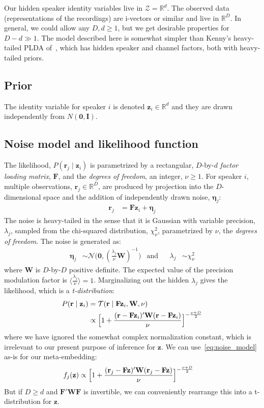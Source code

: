 \documentclass[a4paper,oneside,12pt,english]{report}
\def\zvec{\mathbf{z}}
\def\ND{\mathcal{N}}
\def\expp#1{\bigl\langle#1\bigr\rangle}
\def\R{\mathbb{R}}
\def\Zset{\mathcal{Z}}
\def\Wmat{\mathbf{W}}
\def\Fmat{\mathbf{F}}
\def\Imat{\mathbf{I}}
\def\rvec{\mathbf{r}}
\def\Zset{\mathcal{Z}}
\def\nulvec{\boldsymbol{0}}
\begin{document}
Our hidden speaker identity variables live in $\Zset=\R^d$. The observed data (representations of the recordings) are i-vectors or similar and live in $\R^D$. In general, we could allow any $D,d\ge1$, but we get desirable properties for $D-d\gg 1$. The model described here is somewhat simpler than Kenny's heavy-tailed PLDA of~\cite{ht-plda}, which has hidden speaker and channel factors, both with heavy-tailed priors. 

\subsection{Prior}
The identity variable for speaker $i$ is denoted $\zvec_i\in\R^d$ and they are drawn independently from $N(\nulvec,\Imat)$. 

\subsection{Noise model and likelihood function}
\def\etavec{\boldsymbol{\eta}}
\def\TD{\mathcal{T}}
The likelihood, $P(\rvec_j\mid\zvec_i)$ is parametrized by a rectangular, $D$-by-$d$ \emph{factor loading matrix}, $\Fmat$, and the \emph{degrees of freedom}, an integer, $\nu\ge1$. For speaker $i$, multiple observations, $\rvec_j\in\R^D$, are produced by projection into the $D$-dimensional space and the addition of independently drawn noise, $\etavec_j$:
\begin{align}
\rvec_j &= \Fmat\zvec_i + \etavec_j 
\end{align}
The noise is heavy-tailed in the sense that it is Gaussian with variable precision, $\lambda_j$, sampled from the chi-squared distribution, $\chi_\nu^2$, parametrized by $\nu$, the \emph{degrees of freedom}. The noise is generated as:
\begin{align}
\etavec_j&\sim \ND\bigl(\nulvec,(\frac{\lambda_j}{\nu}\Wmat)^{-1}\bigr) &\text{and} && \lambda_j &\sim \chi_\nu^2
\end{align}
where $\Wmat$ is $D$-by-$D$ positive definite. The expected value of the precision modulation factor is $\expp{\frac{\lambda_j}{\nu}}=1$. Marginalizing out the hidden $\lambda_j$ gives the likelihood, which is a \emph{t-distribution}:
\begin{align}
\label{eq:noise_model}
\begin{split}
P(\rvec\mid\zvec_i) &= \TD(\rvec\mid\Fmat\zvec_i,\Wmat,\nu) \\
&\propto \Bigl[1+\frac{(\rvec-\Fmat\zvec_i)'\Wmat(\rvec-\Fmat\zvec_i)}{\nu}\Bigr]^{-\frac{\nu+D}{2}}
\end{split}
\end{align}
where we have ignored the somewhat complex normalization constant, which is irrelevant to our present purpose of inference for $\zvec$. We can use~\eqref{eq:noise_model} as-is for our meta-embedding: 
\begin{align}
f_j(\zvec) &\propto \Bigl[1+\frac{(\rvec_j-\Fmat\zvec)'\Wmat(\rvec_j-\Fmat\zvec)}{\nu}\Bigr]^{-\frac{\nu+D}{2}}
\end{align}
But if $D\ge d$ and $\Fmat'\Wmat\Fmat$ is invertible, we can conveniently rearrange this into a t-distribution for $\zvec$.
\end{document}
